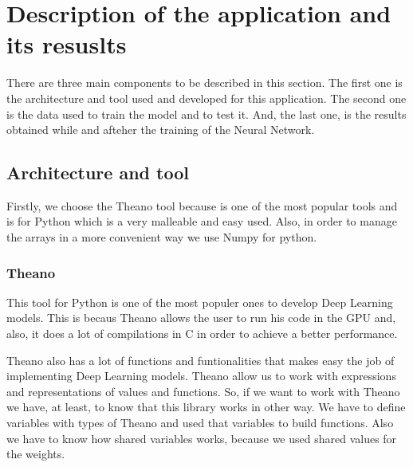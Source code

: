 \documentclass[12pt]{article}
\begin{document}
\section{Description of the application and its resuslts}

There are three main components to be described in this section. The first one is the architecture and tool used and developed for this application. The second one is the data used to train the model and to test it. And, the last one, is the results obtained while and afteher the training of the Neural Network.

\subsection{Architecture and tool}

Firstly, we choose the Theano tool because is one of the most popular tools and is for Python which is a very malleable and easy used. Also, in order to manage the arrays in a more convenient way we use Numpy for python.

\subsubsection{Theano\cite{2016arXiv160502688short}}
This tool for Python is one of the most populer ones to develop Deep Learning models. This is becaus Theano allows the user to run his code in the GPU and, also, it does a lot of compilations in C in order to achieve a better performance.

Theano also has a lot of functions and funtionalities that makes easy the job of implementing Deep Learning models. Theano allow us to work with expressions and representations of values and functions. So, if we want to work with Theano we have, at least, to know that this library works in other way. We have to define variables with types of Theano and used that variables to build functions. Also we have to know how shared variables works, because we used shared values for the weights.
\end{document}
